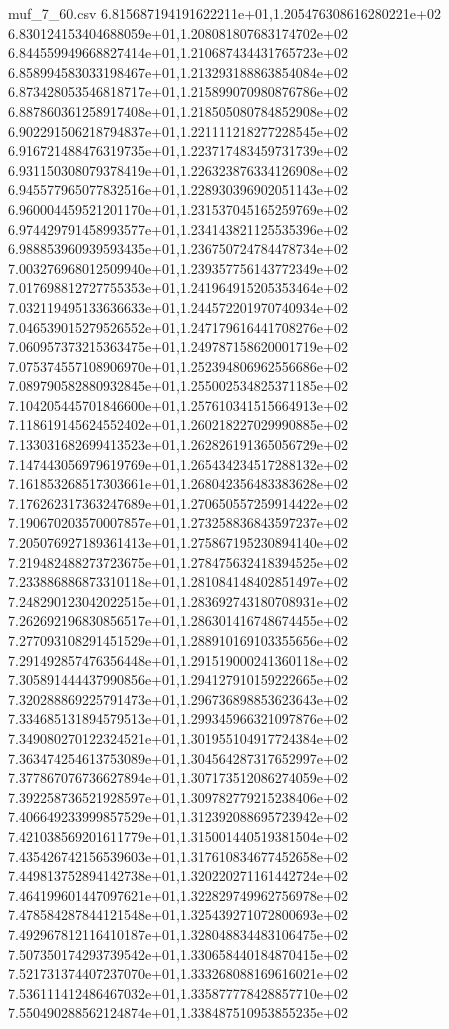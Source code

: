 \begin{filecontents*}{muf_7_60.csv}
6.815687194191622211e+01,1.205476308616280221e+02
6.830124153404688059e+01,1.208081807683174702e+02
6.844559949668827414e+01,1.210687434431765723e+02
6.858994583033198467e+01,1.213293188863854084e+02
6.873428053546818717e+01,1.215899070980876786e+02
6.887860361258917408e+01,1.218505080784852908e+02
6.902291506218794837e+01,1.221111218277228545e+02
6.916721488476319735e+01,1.223717483459731739e+02
6.931150308079378419e+01,1.226323876334126908e+02
6.945577965077832516e+01,1.228930396902051143e+02
6.960004459521201170e+01,1.231537045165259769e+02
6.974429791458993577e+01,1.234143821125535396e+02
6.988853960939593435e+01,1.236750724784478734e+02
7.003276968012509940e+01,1.239357756143772349e+02
7.017698812727755353e+01,1.241964915205353464e+02
7.032119495133636633e+01,1.244572201970740934e+02
7.046539015279526552e+01,1.247179616441708276e+02
7.060957373215363475e+01,1.249787158620001719e+02
7.075374557108906970e+01,1.252394806962556686e+02
7.089790582880932845e+01,1.255002534825371185e+02
7.104205445701846600e+01,1.257610341515664913e+02
7.118619145624552402e+01,1.260218227029990885e+02
7.133031682699413523e+01,1.262826191365056729e+02
7.147443056979619769e+01,1.265434234517288132e+02
7.161853268517303661e+01,1.268042356483383628e+02
7.176262317363247689e+01,1.270650557259914422e+02
7.190670203570007857e+01,1.273258836843597237e+02
7.205076927189361413e+01,1.275867195230894140e+02
7.219482488273723675e+01,1.278475632418394525e+02
7.233886886873310118e+01,1.281084148402851497e+02
7.248290123042022515e+01,1.283692743180708931e+02
7.262692196830856517e+01,1.286301416748674455e+02
7.277093108291451529e+01,1.288910169103355656e+02
7.291492857476356448e+01,1.291519000241360118e+02
7.305891444437990856e+01,1.294127910159222665e+02
7.320288869225791473e+01,1.296736898853623643e+02
7.334685131894579513e+01,1.299345966321097876e+02
7.349080270122324521e+01,1.301955104917724384e+02
7.363474254613753089e+01,1.304564287317652997e+02
7.377867076736627894e+01,1.307173512086274059e+02
7.392258736521928597e+01,1.309782779215238406e+02
7.406649233999857529e+01,1.312392088695723942e+02
7.421038569201611779e+01,1.315001440519381504e+02
7.435426742156539603e+01,1.317610834677452658e+02
7.449813752894142738e+01,1.320220271161442724e+02
7.464199601447097621e+01,1.322829749962756978e+02
7.478584287844121548e+01,1.325439271072800693e+02
7.492967812116410187e+01,1.328048834483106475e+02
7.507350174293739542e+01,1.330658440184870415e+02
7.521731374407237070e+01,1.333268088169616021e+02
7.536111412486467032e+01,1.335877778428857710e+02
7.550490288562124874e+01,1.338487510953855235e+02

\end{filecontents*}

